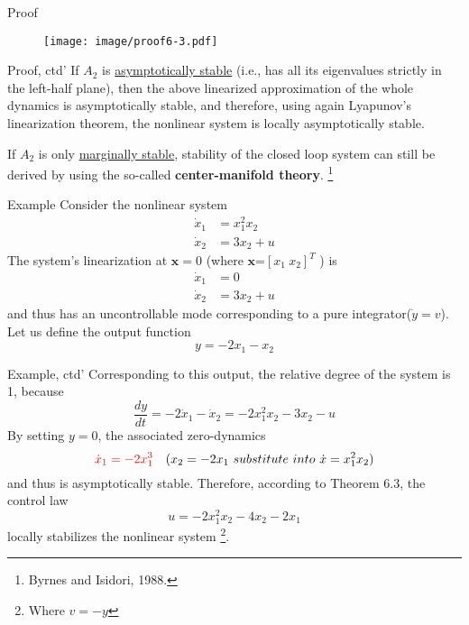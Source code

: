 \documentclass{beamer}
\renewcommand{\vec}[1]{\ensuremath{\boldsymbol{#1}}} %
\begin{document}
\begin{frame}{Proof}
    \begin{figure}
      \centering
      \texttt{[image: image/proof6-3.pdf]}
    \end{figure}
\end{frame}
\begin{frame}{Proof, ctd'}
    If $A_{2}$ is \underline{asymptotically stable} (i.e., has all its eigenvalues strictly in the left-half plane), then the above linearized approximation of the whole dynamics is asymptotically stable, and therefore, using again Lyapunov's linearization theorem, the nonlinear system is locally asymptotically stable.

    \vspace{+10pt}
    If $A_{2}$ is only \underline{marginally stable}, stability of the closed loop system can still be derived by using the so-called \textbf{center-manifold theory}. \footnote{Byrnes and Isidori, 1988.}
\end{frame}


\begin{frame}{Example}
    Consider the nonlinear system
    \begin{equation}\label{example6-14}
      \begin{aligned}
        \dot{x}_{1} &= x_{1}^{2} x_{2} \\
        \dot{x}_{2} &= 3 x_{2}+u
      \end{aligned}
    \end{equation}
    The system's linearization at $\vec{x} = 0$ (where \vec{x}=$\left[x_{1}~x_{2}\right]^{T}$ ) is
    \begin{equation}\nonumber
      \begin{aligned}
        \dot{x}_{1} &= 0 \\
        \dot{x}_{2} &= 3 x_{2}+u
      \end{aligned}
    \end{equation}
    and thus has an {\color{red}uncontrollable mode} corresponding to a pure integrator($\dot{y}=v$).\\
    Let us define the output function
    \begin{equation}
      y=-2x_{1}-x_{2}
    \end{equation}
\end{frame}

\begin{frame}{Example, ctd'}
    Corresponding to this output, the relative degree of the system is 1, because
    $$
    \frac{d y}{d t}=-2 \dot{x}_{1}-\dot{x}_{2}=-2 x_{1}^{2} x_{2}-3 x_{2}-u
    $$
    By setting $y=0$, the associated zero-dynamics
    $$ {\color{red}\dot{x}_{1} = -2x_{1}^{3}} \quad (x_{2}=-2x_{1}~substitute~into~ \dot{x}=x_{1}^{2}x_{2})$$
    and thus is asymptotically stable. Therefore, according to Theorem 6.3, the
    control law
    $$ u=-2 x_{1}^{2} x_{2}-4 x_{2}-2 x_{1} $$
    \vspace{-10pt}
    locally stabilizes the nonlinear system \footnote{Where $v=-y$}.
\end{frame}
\end{document}
